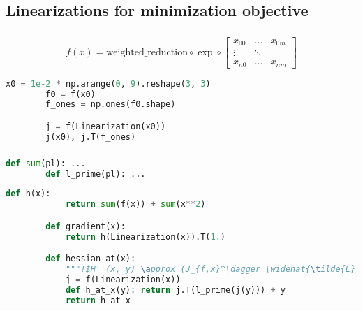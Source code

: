 \documentclass[aspectratio=169,xcolor=dvipsnames]{beamer}
\begin{document}
\subsection{Linearizations for minimization objective}
\begin{frame}[fragile]
	\frametitle{\insertsection}
	\framesubtitle{\insertsubsection}

	\begin{equation*}
		f(x) =
		\text{weighted\_reduction}
		\circ
		\exp
		\circ
		\begin{bmatrix}
			x_{00} & \dots & x_{0m} \\
			\vdots & \ddots & \\
			x_{n0} & \dots & x_{nm}
		\end{bmatrix}
	\end{equation*}

	\vspace{2em}
	\begin{lstlisting}[language=python,escapechar=!]
		x0 = 1e-2 * np.arange(0, 9).reshape(3, 3)
		f0 = f(x0)
		f_ones = np.ones(f0.shape)

		j = f(Linearization(x0))
		j(x0), j.T(f_ones)
	\end{lstlisting}

\end{frame}

\begin{frame}[fragile]
	\frametitle{\insertsection}
	\framesubtitle{\insertsubsection}

	\begin{lstlisting}[language=python,escapechar=!]
		def sum(pl): ...
		def l_prime(pl): ...
	\end{lstlisting}

	\vspace{1em}
	\begin{lstlisting}[language=python,escapechar=!]
		def h(x):
			return sum(f(x)) + sum(x**2)

		def gradient(x):
			return h(Linearization(x)).T(1.)

		def hessian_at(x):
			"""!$H''(x, y) \approx (J_{f,x}^\dagger \widehat{\tilde{L}} J_{f,x} + 1)(y)$!"""
			j = f(Linearization(x))
			def h_at_x(y): return j.T(l_prime(j(y))) + y
			return h_at_x
	\end{lstlisting}

\end{frame}
\end{document}
